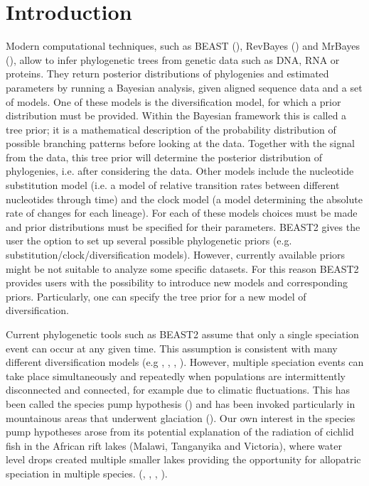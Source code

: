 \section{Introduction}

Modern computational techniques, such as BEAST (\citep{beast,beast2}), RevBayes (\citep{hohna2016revbayes}) and MrBayes (\citep{huelsenbeck2001mrbayes,ronquist2003mrbayes}), allow to infer phylogenetic trees from genetic data 
such as DNA, RNA or proteins.
They return posterior distributions of phylogenies 
and estimated parameters by running a Bayesian analysis, 
given aligned sequence data and a set of models. 
One of these models is the diversification model, for which a prior distribution must be provided. Within the Bayesian framework this is called a tree prior; it is a mathematical description 
of the probability distribution of possible branching patterns before looking at the data. Together with the signal from the data, this tree prior will determine the posterior distribution of phylogenies, i.e. after considering the data. Other models include the nucleotide substitution model (i.e. a model of relative transition rates between different nucleotides through time) and the clock model (a model determining the absolute rate of changes for each lineage). For each of these models choices must be made and prior distributions must be specified for their parameters. BEAST2 gives the user the option to set up 
several possible phylogenetic 
priors (e.g. substitution/clock/diversification models). 
However, currently available priors 
might be not suitable to analyze some specific datasets.
For this reason BEAST2 provides users with the possibility 
to introduce new models and corresponding priors. Particularly, one can specify the tree prior for a new model of diversification.

Current phylogenetic tools such as BEAST2 assume that 
only a single speciation event can occur at any given time.
This assumption is consistent with many different diversification models (e.g \cite{Maddison2007biSSE}, \cite{Valente2015}, 
\cite{etienne2012diversity}, \cite{etienne2014estimating}). However, multiple speciation events can take place simultaneously and repeatedly when populations are intermittently disconnected and connected, for example due to climatic fluctuations. This has been called the species pump hypothesis (\citep{haffer1969speciation}) and has been invoked particularly in mountainous areas that underwent glaciation (\citep{muellner2019origins}). Our own interest in the species pump hypotheses arose from its potential explanation of the radiation of cichlid fish in the African rift lakes (Malawi, Tanganyika and Victoria), where water level drops created multiple smaller lakes providing the opportunity for allopatric speciation in multiple species.  (\citep{verheyen1996mitochondrial}, \citep{sturmbauer2001lake}, \citep{janzen2016}, \citep{janzen2017}).

